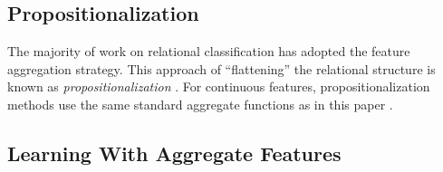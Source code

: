\documentclass[conference]{IEEEtran}
\begin{document}
\subsection{Propositionalization} The majority of work on relational classification has adopted the feature aggregation strategy.
This approach of ``flattening'' the relational structure is known as {\em propositionalization} \cite{Kramer2000}. %
%
For continuous features, propositionalization methods use the same standard aggregate functions as in this paper \cite{Krogel2002,C.Vens2004}.

\subsection{Learning With Aggregate Features} %
\end{document}
